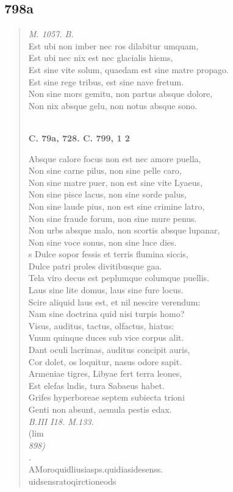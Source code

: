 \documentclass[11pt, a4paper]{report}
\begin{document}
            \subsection*{798a}
      \begin{verse}
      \textit{M. 1057. B.} \\ Est ubi non imber nec ros dilabitur umquam, \\ Est ubi nec nix est nec glacialis hiems, \\ Est sine vite solum, quaedam  \lbrack est \rbrack  sine matre propago. \\ Est sine rege tribus, est sine nave fretum. \\ Non sine mors gemitu, non partus absque dolore, \\ Non nix absque gelu, non notus absque sono. \\ 
        ﻿\pagebreak 
    \begin{center} \textbf{C. 79a, 728. C. 799, 1 2} \end{center} \marginpar{[275]} Absque calore focus non est nec amore puella, \\ Non sine carne pilus, non sine pelle caro, \\ Non sine matre puer, non est sine vite Lyaeus, \\ Non sine pisce lacus, non sine sorde palus, \\ Non sine laude pius, non est sine crimine latro, \\ Non sine fraude forum, non sine mure penus. \\ Non urbs absque malo, non scortis absque lupanar, \\ Non sine voce sonus, non sine luce dies. \\ s Dulce sopor fessis et terris flumina siccis, \\ Dulce patri proles divitibusque gaa. \\ Tela viro decus est peplumque columque puellis. \\ Laus sine lite domus, laus sine fure locus. \\ Scire aliquid laus est, et nil nescire verendum: \\ Nam sine doctrina quid nisi turpis homo? \\ Visus, auditus, tactus, olfactus, hiatus: \\ Vnum quinque duces sub vice corpus alit. \\ Dant oculi lacrimas, auditus concipit auris, \\ Cor dolet, os loquitur, nasus odore sapit. \\ Armeniae tigres, Libyae fert terra leones, \\ Est elefas lndis, tura Sabaeus habet. \\ Grifes hyperboreae septem subiecta trioni \\ Genti non absunt, aemula pestis edax. \\ \textit{B.III I18. M.133.} \\ (lim \\ \textit{898)} \\ \textit{.} \\  \lbrack AMoroquidliusiasps.quidiasidesenss. \\ uidsensratoqirctioneods \\ 

\end{verse}
\end{document}
